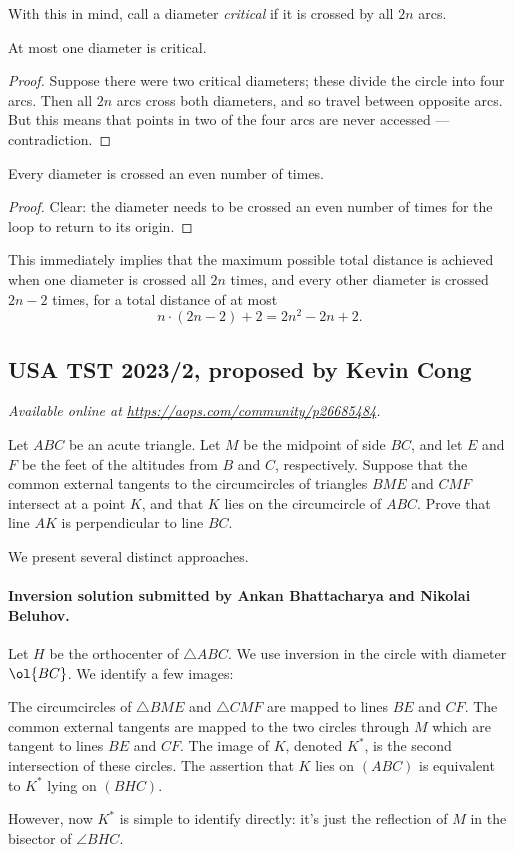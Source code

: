 \documentclass[11pt]{scrartcl}
\begin{document}
With this in mind, call a diameter \emph{critical} if it is crossed by all $2n$ arcs.
\begin{claim*}
  At most one diameter is critical.
\end{claim*}
\begin{proof}
  Suppose there were two critical diameters; these divide the circle into four arcs.
  Then all $2n$ arcs cross both diameters, and so travel between opposite arcs.
  But this means that points in two of the four arcs are never accessed --- contradiction.
\end{proof}

\begin{claim*}
  Every diameter is crossed an even number of times.
\end{claim*}
\begin{proof}
  Clear: the diameter needs to be crossed an even number of times for the loop to return to its origin.
\end{proof}

This immediately implies that the maximum possible total distance
is achieved when one diameter is crossed all $2n$ times,
and every other diameter is crossed $2n-2$ times,
for a total distance of at most
\[ n \cdot (2n-2) + 2 = 2n^2 - 2n + 2. \]
\pagebreak

\subsection{USA TST 2023/2, proposed by Kevin Cong}
\textsl{Available online at \url{https://aops.com/community/p26685484}.}
\begin{mdframed}[style=mdpurplebox,frametitle={Problem statement}]
Let $ABC$ be an acute triangle.
Let $M$ be the midpoint of side $BC$,
and let $E$ and $F$ be the feet of the altitudes from $B$ and $C$, respectively.
Suppose that the common external tangents
to the circumcircles of triangles $BME$ and $CMF$ intersect at a point $K$,
and that $K$ lies on the circumcircle of $ABC$.
Prove that line $AK$ is perpendicular to line $BC$.
\end{mdframed}
We present several distinct approaches.

\paragraph{Inversion solution submitted by Ankan Bhattacharya and Nikolai Beluhov.}
Let $H$ be the orthocenter of $\triangle ABC$.
We use inversion in the circle with diameter $\ol{BC}$.
We identify a few images:
\begin{itemize}
  \ii The circumcircles of $\triangle BME$ and $\triangle CMF$ are mapped to lines $BE$ and $CF$.
  \ii The common external tangents are mapped to the two circles through $M$
  which are tangent to lines $BE$ and $CF$.
  \ii The image of $K$, denoted $K^\ast$, is the second intersection of these circles.
  \ii The assertion that $K$ lies on $(ABC)$ is equivalent to $K^\ast$ lying on $(BHC)$.
\end{itemize}
However, now $K^\ast$ is simple to identify directly:
it's just the reflection of $M$ in the bisector of $\angle BHC$.
\end{document}
